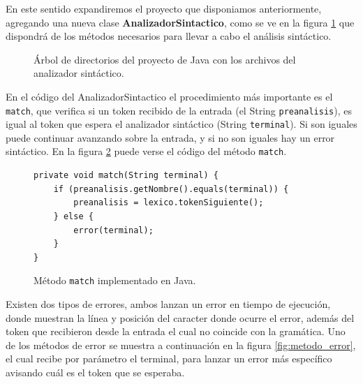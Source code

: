 En este sentido expandiremos el proyecto que disponiamos anteriormente, agregando una nueva clase {\bf AnalizadorSintactico}, como se ve en la figura \ref{fig:arbol_dir_3} que dispondrá de los métodos necesarios para llevar a cabo el análisis sintáctico.

\begin{figure}[H]
\caption{Árbol de directorios del proyecto de Java con los archivos del analizador sintáctico.}
\label{fig:arbol_dir_3}
\end{figure}

En el código del AnalizadorSintactico el procedimiento más importante es el \texttt{match}, que verifica si un token recibido de la entrada (el String \texttt{preanalisis}), es igual al token que espera el analizador sintáctico (String \texttt{terminal}). Si son iguales puede continuar avanzando sobre la entrada, y si no son iguales hay un error sintáctico. En la figura \ref{fig:metodo_match} puede verse el código del método \texttt{match}.

\begin{figure}[H]
\begin{verbatim}
private void match(String terminal) {
	if (preanalisis.getNombre().equals(terminal)) {
		preanalisis = lexico.tokenSiguiente();
	} else {
		error(terminal);
	}
}
\end{verbatim}
\caption{Método \texttt{match} implementado en Java.}
\label{fig:metodo_match}
\end{figure}
    

Existen dos tipos de errores, ambos lanzan un error en tiempo de ejecución, donde muestran la línea y posición del caracter donde ocurre el error, además del token que recibieron desde la entrada el cual no coincide con la gramática. Uno de los métodos de error se muestra a continuación en la figura \ref{fig:metodo_error}, el cual recibe por parámetro el terminal, para lanzar un error más específico avisando cuál es el token que se esperaba.

